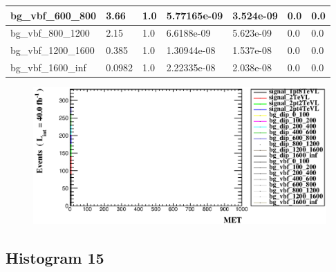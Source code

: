 \documentclass[a4paper, 10pt]{article}
\begin{document}
\begin{table}[H]
\begin{center}
\begin{tabular}{|m{23.0mm}|m{23.0mm}|m{18.0mm}|m{19.0mm}|m{19.0mm}|m{19.0mm}|m{19.0mm}|}
      \hline
      {\cellcolor{white}         bg\_vbf\_600\_800}& {\cellcolor{white}         3.66}& {\cellcolor{white}         1.0}& {\cellcolor{white}         5.77165e-09}& {\cellcolor{white}         3.524e-09}& {\cellcolor{green}         0.0}& {\cellcolor{green}         0.0}\\
      \hline
      {\cellcolor{white}         bg\_vbf\_800\_1200}& {\cellcolor{white}         2.15}& {\cellcolor{white}         1.0}& {\cellcolor{white}         6.6188e-09}& {\cellcolor{white}         5.623e-09}& {\cellcolor{green}         0.0}& {\cellcolor{green}         0.0}\\
      \hline
      {\cellcolor{white}         bg\_vbf\_1200\_1600}& {\cellcolor{white}         0.385}& {\cellcolor{white}         1.0}& {\cellcolor{white}         1.30944e-08}& {\cellcolor{white}         1.537e-08}& {\cellcolor{green}         0.0}& {\cellcolor{green}         0.0}\\
      \hline
      {\cellcolor{white}         bg\_vbf\_1600\_inf}& {\cellcolor{white}         0.0982}& {\cellcolor{white}         1.0}& {\cellcolor{white}         2.22335e-08}& {\cellcolor{white}         2.038e-08}& {\cellcolor{green}         0.0}& {\cellcolor{green}         0.0}\\
\hline
    \end{tabular}
  \end{center}
\end{table}

\begin{figure}[H]
  \begin{center}
    \includegraphics[scale=0.45]{selection_13.eps}\\
\caption{   }
  \end{center}
\end{figure}
      \newpage
\subsection{ Histogram 15}
\end{document}
